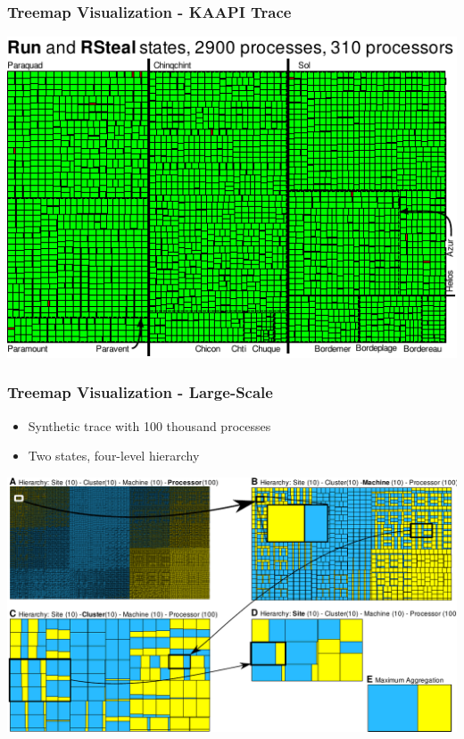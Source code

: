 \frame
{
   \frametitle{Treemap Visualization - KAAPI Trace}


   \includegraphics[width=\textwidth]{img/kaapi-scenario-c.pdf}
}


\frame
{
   \frametitle{Treemap Visualization - Large-Scale}

   \begin{itemize}
   \item Synthetic trace with 100 thousand processes
   \item Two states, four-level hierarchy
   \end{itemize}

   \vfill
   \includegraphics[width=\textwidth]{img/large-scale.pdf}
}



